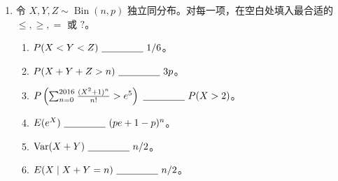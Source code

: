 \documentclass[UTF8, 12pt, fontset=fandol, oneside]{ctexart}
\begin{document}
\begin{enumerate}
  \item 令 $X,Y,Z\sim\operatorname{Bin}(n,p)$ 独立同分布。对每一项，在空白处填入最合适的 $\le,\ge,=$ 或 $?$。
  \begin{enumerate}
    \item $P(X<Y<Z)\ \underline{\hspace{1.5cm}}\ 1/6$。
    \item $P(X+Y+Z>n)\ \underline{\hspace{1.5cm}}\ 3p$。
    \item $P\left(\sum_{n=0}^{2016}\frac{(X^2+1)^n}{n!}>e^5\right)\ \underline{\hspace{1.5cm}}\ P(X>2)$。
    \item $E(e^X)\ \underline{\hspace{1.5cm}}\ (pe+1-p)^n$。
    \item $\operatorname{Var}(X+Y)\ \underline{\hspace{1.5cm}}\ n/2$。
    \item $E(X\mid X+Y=n)\ \underline{\hspace{1.5cm}}\ n/2$。
  \end{enumerate}
\end{enumerate}
\end{document}

